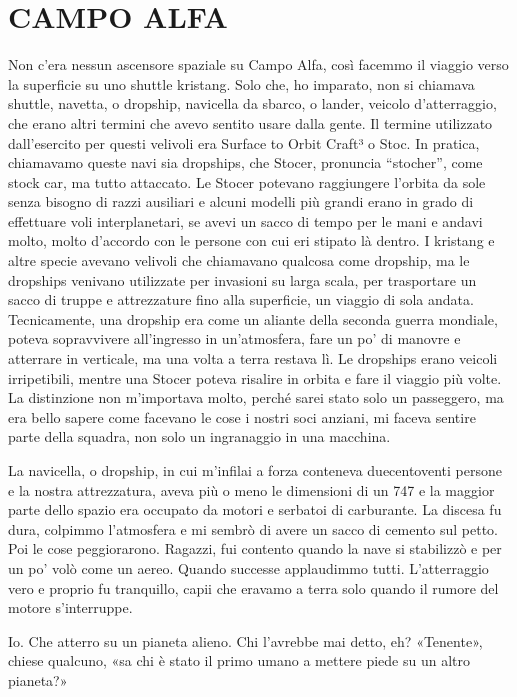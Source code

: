 \chapter{CAMPO ALFA}\label{campo-alfa}

\hfill\break

Non c'era nessun ascensore spaziale su Campo Alfa, così facemmo il
viaggio verso la superficie su uno shuttle kristang. Solo che, ho
imparato, non si chiamava shuttle, navetta, o dropship, navicella da
sbarco, o lander, veicolo d'atterraggio, che erano altri termini che
avevo sentito usare dalla gente. Il termine utilizzato dall'esercito per
questi velivoli era Surface to Orbit Craft³ o Stoc. In pratica,
chiamavamo queste navi sia dropships, che Stocer, pronuncia ``stocher'',
come stock car, ma tutto attaccato. Le Stocer potevano raggiungere
l'orbita da sole senza bisogno di razzi ausiliari e alcuni modelli più
grandi erano in grado di effettuare voli interplanetari, se avevi un
sacco di tempo per le mani e andavi molto, molto d'accordo con le
persone con cui eri stipato là dentro. I kristang e altre specie avevano
velivoli che chiamavano qualcosa come dropship, ma le dropships venivano
utilizzate per invasioni su larga scala, per trasportare un sacco di
truppe e attrezzature fino alla superficie, un viaggio di sola andata.
Tecnicamente, una dropship era come un aliante della seconda guerra
mondiale, poteva sopravvivere all'ingresso in un'atmosfera, fare un po'
di manovre e atterrare in verticale, ma una volta a terra restava lì. Le
dropships erano veicoli irripetibili, mentre una Stocer poteva risalire
in orbita e fare il viaggio più volte. La distinzione non m'importava
molto, perché sarei stato solo un passeggero, ma era bello sapere come
facevano le cose i nostri soci anziani, mi faceva sentire parte della
squadra, non solo un ingranaggio in una macchina.

La navicella, o dropship, in cui m'infilai a forza conteneva
duecentoventi persone e la nostra attrezzatura, aveva più o meno le
dimensioni di un 747 e la maggior parte dello spazio era occupato da
motori e serbatoi di carburante. La discesa fu dura, colpimmo
l'atmosfera e mi sembrò di avere un sacco di cemento sul petto. Poi le
cose peggiorarono. Ragazzi, fui contento quando la nave si stabilizzò e
per un po' volò come un aereo. Quando successe applaudimmo tutti.
L'atterraggio vero e proprio fu tranquillo, capii che eravamo a terra
solo quando il rumore del motore s'interruppe.

Io. Che atterro su un pianeta alieno. Chi l'avrebbe mai detto, eh?
«Tenente», chiese qualcuno, «sa chi è stato il primo umano a mettere
piede su un altro pianeta?»

